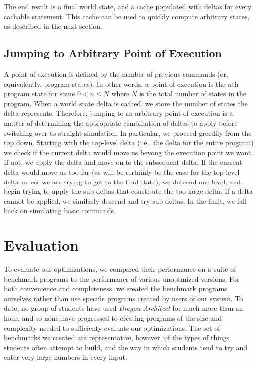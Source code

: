 \documentclass{sig-alternate}
\newcommand{\da}{\emph{Dragon Architect}}
\begin{document}
The end result is a final world state, and a cache populated with deltas for every cachable statement. This cache can be used to quickly compute arbitrary states, as described in the next section.

\subsection{Jumping to Arbitrary Point of Execution}

A point of execution is defined by the number of previous commands (or, equivalently, program states). In other words, a point of execution is the $n$th program state for some $0<n\le N$ where $N$ is the total number of states in the program. When a world state delta is cached, we store the number of states the delta represents. Therefore, jumping to an arbitrary point of execution is a matter of determining the appropriate combination of deltas to apply before switching over to straight simulation. In particular, we proceed greedily from the top down. Starting with the top-level delta (i.e., the delta for the entire program) we check if the current delta would move us beyong the execution point we want. If not, we apply the delta and move on to the subsequent delta. If the current delta would move us too far (as will be certainly be the case for the top-level delta unless we are trying to get to the final state), we descend one level, and begin trying to apply the sub-deltas that constitute the too-large delta. If a delta cannot be applied, we similarly descend and try sub-deltas. In the limit, we fall back on simulating basic commands. 

\section{Evaluation}
To evaluate our optimizations, we compared their performance on a suite of benchmark programs to the performance of various unoptmized versions. For both convenience and completeness, we created the benchmark programs ourselves rather than use specific programs created by users of our system. To date, no group of students have used \da{} for much more than an hour, and so none have progressed to creating programs of the size and complexity needed to sufficienty evaluate our optimizations. The set of benchmarks we created are representative, however, of the types of things students often attempt to build, and the way in which students tend to try and enter very large numbers in every input. 
\end{document}

